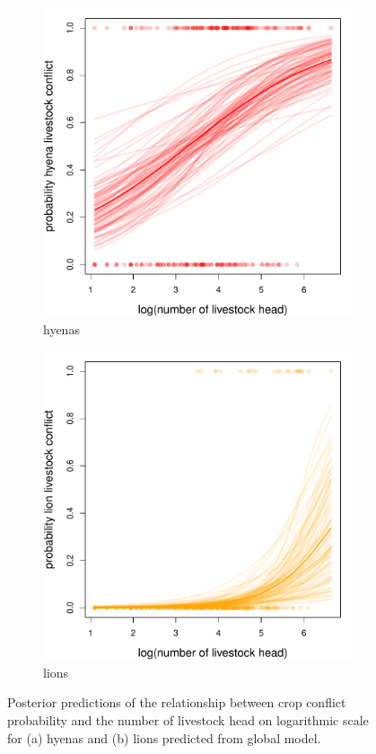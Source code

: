 \documentclass[12pt,]{article}
\begin{document}
\begin{figure}[H]
  \centering
	\begin{subfigure}[b]{0.49\textwidth}
	\includegraphics[width=\textwidth]{Figures/log_livestock_head_livestock_global_conflict_hyena.pdf} 
    \caption{hyenas}
   	    \label{fig:lLSHHHhyena}
\end{subfigure}
\begin{subfigure}[b]{0.49\textwidth}
	\includegraphics[width=\textwidth]{Figures/log_livestock_head_livestock_global_conflict_lion.pdf}  
    \caption{lions}
  	\label{fig:lLSHleo}
\end{subfigure}
\caption{Posterior predictions of the relationship between crop conflict probability and the number of livestock head on logarithmic scale for (a) hyenas and (b) lions predicted from global model.}
\end{figure}
\end{document}
